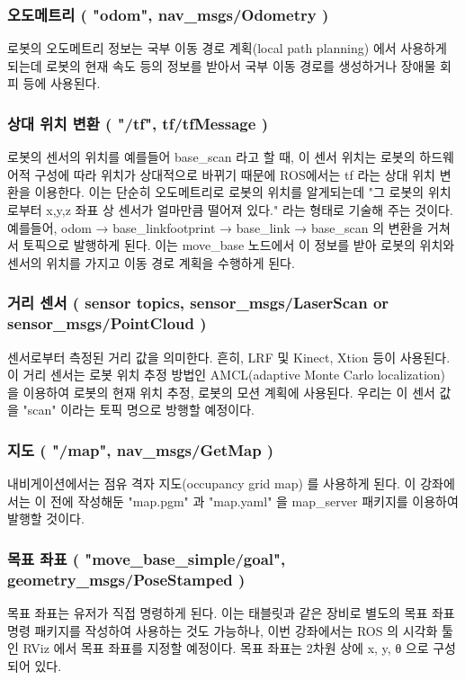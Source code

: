 \subsubsection{오도메트리 ( "odom", nav\_msgs/Odometry )}
로봇의 오도메트리 정보는 국부 이동 경로 계획(local path planning) 에서 사용하게 되는데 로봇의 현재 속도 등의 정보를 받아서 국부 이동 경로를 생성하거나 장애물 회피 등에 사용된다.

\subsubsection{상대 위치 변환 ( "/tf", tf/tfMessage )}
로봇의 센서의 위치를 예를들어 base\_scan 라고 할 때, 이 센서 위치는 로봇의 하드웨어적 구성에 따라 위치가 상대적으로 바뀌기 때문에 ROS에서는 tf 라는 상대 위치 변환을 이용한다. 이는 단순히 오도메트리로 로봇의 위치를 알게되는데 "그 로봇의 위치로부터 x,y,z 좌표 상 센서가 얼마만큼 떨어져 있다." 라는 형태로 기술해 주는 것이다. 예를들어,  odom → base\_linkfootprint → base\_link → base\_scan 의 변환을 거쳐서 토픽으로 발행하게 된다. 이는 move\_base 노드에서 이 정보를 받아 로봇의 위치와 센서의 위치를 가지고 이동 경로 계획을 수행하게 된다.

\subsubsection{거리 센서 ( sensor topics, sensor\_msgs/LaserScan or sensor\_msgs/PointCloud  )}
센서로부터 측정된 거리 값을 의미한다. 흔히, LRF 및 Kinect, Xtion 등이 사용된다. 이 거리 센서는 로봇 위치 추정 방법인 AMCL(adaptive Monte Carlo localization) 을 이용하여 로봇의 현재 위치 추정, 로봇의 모션 계획에 사용된다. 우리는 이 센서 값을 "scan" 이라는 토픽 명으로 방행할 예정이다.

\subsubsection{지도 ( "/map", nav\_msgs/GetMap )}
내비게이션에서는 점유 격자 지도(occupancy grid map) 를 사용하게 된다. 이 강좌에서는 이 전에 작성해둔 "map.pgm" 과 "map.yaml" 을 map\_server 패키지를 이용하여 발행할 것이다. 

\subsubsection{목표 좌표 ( "move\_base\_simple/goal", geometry\_msgs/PoseStamped )}
목표 좌표는 유저가 직접 명령하게 된다. 이는 태블릿과 같은 장비로 별도의 목표 좌표 명령 패키지를 작성하여 사용하는 것도 가능하나, 이번 강좌에서는 ROS 의 시각화 툴인 RViz 에서 목표 좌표를 지정할 예정이다. 목표 좌표는 2차원 상에 x, y, θ 으로 구성되어 있다.

